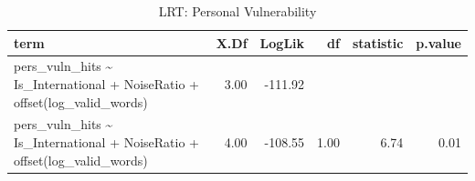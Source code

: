 \begin{table}[ht]
\centering
\begin{tabular}{lrrrrr}
  \hline
term & X.Df & LogLik & df & statistic & p.value \\ 
  \hline
pers\_vuln\_hits \~{} Is\_International + NoiseRatio + offset(log\_valid\_words) & 3.00 & -111.92 &  &  &  \\ 
  pers\_vuln\_hits \~{} Is\_International + NoiseRatio + offset(log\_valid\_words) & 4.00 & -108.55 & 1.00 & 6.74 & 0.01 \\ 
   \hline
\end{tabular}
\caption{LRT: Personal Vulnerability} 
\end{table}
